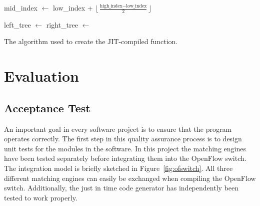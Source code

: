\documentclass[a4paper,
		12pt,
		parskip=full,
		titlepage
		]{scrartcl}
\begin{document}
\begin{algorithm}
\begin{algorithmic}[1]
    \State mid\_index $\gets$ low\_index + $\lfloor\frac{\textrm{high\_index} - \textrm{low\_index}}{2}\rfloor$
    
    \State {}
        \State {}
        \State {}
        \State {}
        \State {} 
        \State {}
    \EndIf
    
    \State left\_tree $\gets$ 
    \State right\_tree $\gets$ 
    
    \State {}
    \State {}
    \State {}
    \State {}
    \State {}
    \State {}
    \State {}
    \State {}
\EndFunction
\end{algorithmic}
\caption{The algorithm used to create the JIT-compiled function.}
\label{alg:jit}
\end{algorithm}

\section{Evaluation}
\subsection{Acceptance Test}
An important goal in every software project is to ensure that the program operates correctly.
The first step in this quality assurance process is to design unit tests for the modules in the software.
In this project the matching engines have been tested separately before integrating them into the OpenFlow switch.
The integration model is briefly sketched in Figure~\ref{fig:ofswitch}.
All three different matching engines can easily be exchanged when compiling the OpenFlow switch.
Additionally, the just in time code generator has independently been tested to work properly.
\end{document}
